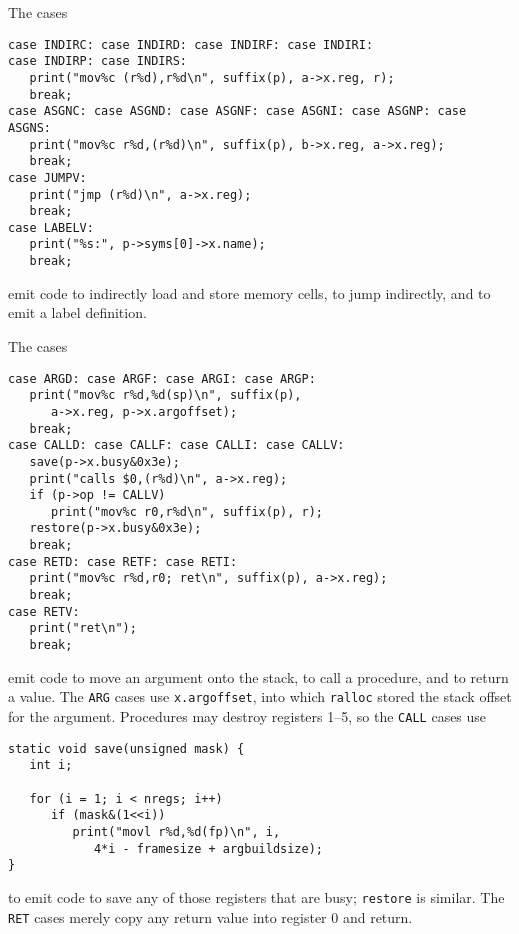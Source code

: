 The cases
\begin{verbatim}
case INDIRC: case INDIRD: case INDIRF: case INDIRI:
case INDIRP: case INDIRS:
   print("mov%c (r%d),r%d\n", suffix(p), a->x.reg, r);
   break;
case ASGNC: case ASGND: case ASGNF: case ASGNI: case ASGNP: case ASGNS:
   print("mov%c r%d,(r%d)\n", suffix(p), b->x.reg, a->x.reg);
   break;
case JUMPV:
   print("jmp (r%d)\n", a->x.reg);
   break;
case LABELV:
   print("%s:", p->syms[0]->x.name);
   break;
\end{verbatim}
emit code to indirectly load and store memory cells, to jump indirectly,
and to emit a label definition.

The cases
\begin{verbatim}
case ARGD: case ARGF: case ARGI: case ARGP:
   print("mov%c r%d,%d(sp)\n", suffix(p),
      a->x.reg, p->x.argoffset);
   break;
case CALLD: case CALLF: case CALLI: case CALLV:
   save(p->x.busy&0x3e);
   print("calls $0,(r%d)\n", a->x.reg);
   if (p->op != CALLV)
      print("mov%c r0,r%d\n", suffix(p), r);
   restore(p->x.busy&0x3e);
   break;
case RETD: case RETF: case RETI:
   print("mov%c r%d,r0; ret\n", suffix(p), a->x.reg);
   break;
case RETV:
   print("ret\n");
   break;
\end{verbatim}
emit code to move an argument onto the stack, to call a procedure, and
to return a value. The \verb|ARG| cases use \verb|x.argoffset|,
into which \verb|ralloc| stored the stack offset for the argument.
Procedures may destroy registers 1--5, so the \verb|CALL| cases use
\begin{verbatim}
static void save(unsigned mask) {
   int i;

   for (i = 1; i < nregs; i++)
      if (mask&(1<<i))
         print("movl r%d,%d(fp)\n", i,
            4*i - framesize + argbuildsize);
}
\end{verbatim}
to emit code to save any of those registers that are busy;
\verb|restore| is similar.
The \verb|RET| cases merely copy any return value into register 0 and return.

